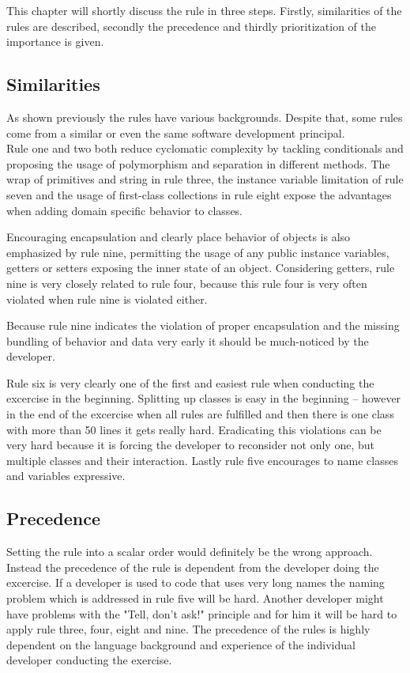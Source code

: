 This chapter will shortly discuss the rule in three steps. Firstly, similarities of the rules are described, secondly the precedence and thirdly prioritization of the importance is given.

\subsection*{Similarities}
As shown previously the rules have various backgrounds. Despite that, some rules come from a similar or even the same software development principal.
\\

Rule one and two both reduce cyclomatic complexity by tackling conditionals and proposing the usage of polymorphism and separation in different methods.
The wrap of primitives and string in rule three, the instance variable limitation of rule seven and the usage of first-class collections in rule eight expose the advantages when adding domain specific behavior to classes. 

Encouraging encapsulation and clearly place behavior of objects is also emphasized by rule nine, permitting the usage of any public instance variables, getters or setters exposing the inner state of an object. Considering getters, rule nine is very closely related to rule four, because this rule four is very often violated when rule nine is violated either. 

Because rule nine indicates the violation of proper encapsulation and the missing bundling of behavior and data very early it should be much-noticed by the developer. 

Rule six is very clearly one of the first and easiest rule when conducting the excercise in the beginning. Splitting up classes is easy in the beginning -- however in the end of the excercise when all rules are fulfilled and then there is one class with more than 50 lines it gets really hard. Eradicating this violations can be very hard because it is forcing the developer to reconsider not only one, but multiple classes and their interaction. 
Lastly rule five encourages to name classes and variables expressive. 

\subsection*{Precedence}
Setting the rule into a scalar order would definitely be the wrong approach. Instead the precedence of the rule is dependent from the developer doing the excercise. If a developer is used to code that uses very long names the naming problem which is addressed in rule five will be hard. Another developer might have problems with the "Tell, don't ask!" \cite{telldontaskoriginal} principle and for him it will be hard to apply rule three, four, eight and nine. The precedence of the rules is highly dependent on the language background and experience of the individual developer conducting the exercise. 

